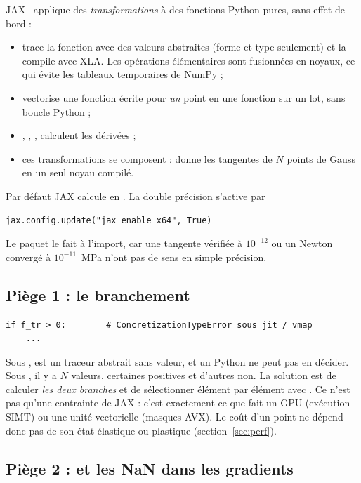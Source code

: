 JAX~\cite{jax2018} applique des \emph{transformations} à des fonctions Python pures, sans effet de bord :
\begin{itemize}[nosep]
  \item {} trace la fonction avec des valeurs abstraites (forme et type seulement) et la compile avec XLA. Les opérations élémentaires sont fusionnées en noyaux, ce qui évite les tableaux temporaires de NumPy ;
  \item {} vectorise une fonction écrite pour \emph{un} point en une fonction sur un lot, sans boucle Python ;
  \item {}, , ,  calculent les dérivées ;
  \item ces transformations se composent :  donne les tangentes de $N$ points de Gauss en un seul noyau compilé.
\end{itemize}
Par défaut JAX calcule en . La double précision s'active par
\begin{lstlisting}
jax.config.update("jax_enable_x64", True)
\end{lstlisting}
Le paquet le fait à l'import, car une tangente vérifiée à $10^{-12}$ ou un Newton convergé à $10^{-11}$~MPa n'ont pas de sens en simple précision.

\subsection{Piège 1 : le branchement}

\begin{lstlisting}
if f_tr > 0:        # ConcretizationTypeError sous jit / vmap
    ...
\end{lstlisting}
Sous ,  est un traceur abstrait sans valeur, et un  Python ne peut pas en décider. Sous , il y a $N$ valeurs, certaines positives et d'autres non. La solution est de calculer \emph{les deux branches} et de sélectionner élément par élément avec . Ce n'est pas qu'une contrainte de JAX : c'est exactement ce que fait un GPU (exécution SIMT) ou une unité vectorielle (masques AVX). Le coût d'un point ne dépend donc pas de son état élastique ou plastique (section~\ref{sec:perf}).

\subsection{Piège 2 : \texorpdfstring{}{where} et les NaN dans les gradients}\label{sec:piege-nan}

